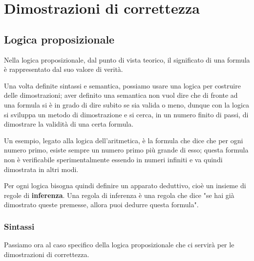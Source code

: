 \chapter{Dimostrazioni di correttezza}
\section{Logica proposizionale}
Nella logica proposizionale, dal punto di vista teorico, il significato di una formula è rappresentato dal suo valore di verità.

Una volta definite sintassi e semantica, possiamo usare una logica per costruire delle dimostrazioni; aver definito una semantica non vuol dire che di fronte ad una formula si è in grado di dire subito se sia valida o meno, dunque con la logica si sviluppa un metodo di dimostrazione e si cerca, in un numero finito di passi, di dimostrare la validità di una certa formula.

Un esempio, legato alla logica dell'aritmetica, è la formula che dice che per ogni numero primo, esiste sempre un numero primo più grande di esso; questa formula non è verificabile sperimentalmente essendo in numeri infiniti e va quindi dimostrata in altri modi.

Per ogni logica bisogna quindi definire un apparato deduttivo, cioè un insieme di regole di \textbf{inferenza}. Una regola di inferenza è una regola che dice "se hai già dimostrato queste premesse, allora puoi dedurre questa formula".

\subsection{Sintassi}
Passiamo ora al caso specifico della logica proposizionale che ci servirà per le dimostrazioni di correttezza.

